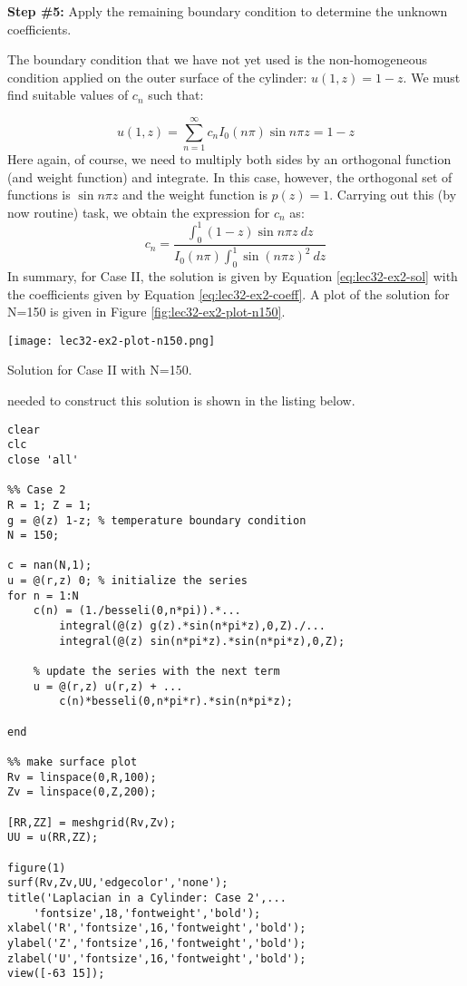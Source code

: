 \vspace{0.25cm}

\noindent\textbf{Step \#5:} Apply the remaining boundary condition to determine the unknown coefficients.

\vspace{0.25cm}

\noindent The boundary condition that we have not yet used is the non-homogeneous condition applied on the outer surface of the cylinder: $u(1,z) = 1-z$.  We must find suitable values of $c_n$ such that:

\begin{equation*}
u(1,z) = \sum\limits_{n=1}^{\infty} c_n I_0(n \pi)\sin{n \pi z} = 1-z
\end{equation*}
Here again, of course, we need to multiply both sides by an orthogonal function (and weight function) and integrate.  In this case, however, the orthogonal set of functions is $\sin{n\pi z}$ and the weight function is $p(z)=1$.  Carrying out this (by now routine) task, we obtain the expression for $c_n$ as:
\begin{equation}
c_n = \frac{\int_0^1 (1-z)\sin{n \pi z} \ dz}{I_0(n \pi) \int_0^1 \sin{(n \pi z)}^2 \ dz}
\label{eq:lec32-ex2-coeff}
\end{equation}
In summary, for Case II, the solution is given by Equation \ref{eq:lec32-ex2-sol} with the coefficients given by Equation \ref{eq:lec32-ex2-coeff}.  A plot of the solution for N=150 is given in Figure \ref{fig:lec32-ex2-plot-n150}.
\begin{marginfigure}
\texttt{[image: lec32-ex2-plot-n150.png]}
\caption{Solution for Case II with N=150.}
\label{fig:lec32-ex2-plot-n150}
\end{marginfigure}

 needed to construct this solution is shown in the listing below.
\begin{lstlisting}[style=myMatlab, name=lec32-ex2]
clear
clc
close 'all'

%% Case 2
R = 1; Z = 1;
g = @(z) 1-z; % temperature boundary condition
N = 150;

c = nan(N,1);
u = @(r,z) 0; % initialize the series
for n = 1:N
    c(n) = (1./besseli(0,n*pi)).*...
        integral(@(z) g(z).*sin(n*pi*z),0,Z)./...
        integral(@(z) sin(n*pi*z).*sin(n*pi*z),0,Z);
    
    % update the series with the next term
    u = @(r,z) u(r,z) + ...
        c(n)*besseli(0,n*pi*r).*sin(n*pi*z);
    
end

%% make surface plot
Rv = linspace(0,R,100);
Zv = linspace(0,Z,200);

[RR,ZZ] = meshgrid(Rv,Zv);
UU = u(RR,ZZ);

figure(1)
surf(Rv,Zv,UU,'edgecolor','none');
title('Laplacian in a Cylinder: Case 2',...
    'fontsize',18,'fontweight','bold');
xlabel('R','fontsize',16,'fontweight','bold');
ylabel('Z','fontsize',16,'fontweight','bold');
zlabel('U','fontsize',16,'fontweight','bold');
view([-63 15]);
\end{lstlisting}

